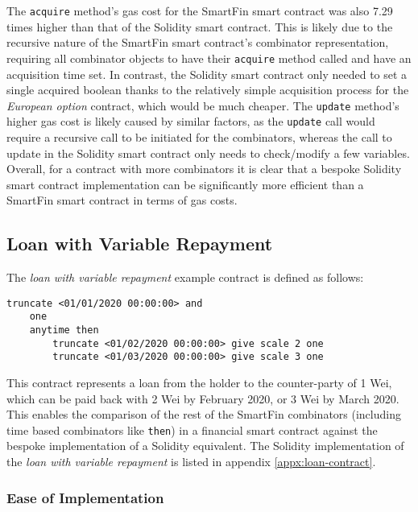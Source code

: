 The \texttt{acquire} method's gas cost for the SmartFin smart contract was also 7.29 times higher than that of the Solidity smart contract. This is likely due to the recursive nature of the SmartFin smart contract's combinator representation, requiring all combinator objects to have their \texttt{acquire} method called and have an acquisition time set. In contrast, the Solidity smart contract only needed to set a single acquired boolean thanks to the relatively simple acquisition process for the \textit{European option} contract, which would be much cheaper. The \texttt{update} method's higher gas cost is likely caused by similar factors, as the \texttt{update} call would require a recursive call to be initiated for the combinators, whereas the call to update in the Solidity smart contract only needs to check/modify a few variables. \\

Overall, for a contract with more combinators it is clear that a bespoke Solidity smart contract implementation can be significantly more efficient than a SmartFin smart contract in terms of gas costs.


\subsection{Loan with Variable Repayment}

The \textit{loan with variable repayment} example contract is defined as follows:

\begin{Verbatim}[frame=single, samepage=true, rulecolor=\textcolor{black!50}]
truncate <01/01/2020 00:00:00> and
    one
    anytime then
        truncate <01/02/2020 00:00:00> give scale 2 one
        truncate <01/03/2020 00:00:00> give scale 3 one
\end{Verbatim}

This contract represents a loan from the holder to the counter-party of 1 Wei, which can be paid back with 2 Wei by February 2020, or 3 Wei by March 2020. This enables the comparison of the rest of the SmartFin combinators (including time based combinators like \texttt{then}) in a financial smart contract against the bespoke implementation of a Solidity equivalent. The Solidity implementation of the \textit{loan with variable repayment} is listed in appendix \ref{appx:loan-contract}.


\subsubsection{Ease of Implementation}

